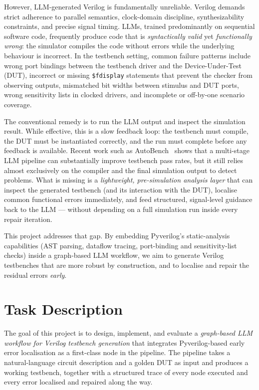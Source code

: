 \documentclass[11pt,a4paper, titlepage=false]{scrreprt}
\begin{document}
However, LLM-generated Verilog is fundamentally unreliable. Verilog demands strict adherence to
parallel semantics, clock-domain discipline, synthesizability constraints, and precise signal
timing. LLMs, trained predominantly on sequential software code, frequently produce code that
is \emph{syntactically valid} yet \emph{functionally wrong}: the simulator compiles the code
without errors while the underlying behaviour is incorrect. In the testbench setting, common
failure patterns include wrong port bindings between the testbench driver and the
Device-Under-Test (DUT), incorrect or missing \texttt{\$fdisplay} statements that prevent the
checker from observing outputs, mismatched bit widths between stimulus and DUT ports, wrong
sensitivity lists in clocked drivers, and incomplete or off-by-one scenario coverage.

The conventional remedy is to run the LLM output and inspect the simulation result. While
effective, this is a slow feedback loop: the testbench must compile, the DUT must be
instantiated correctly, and the run must complete before any feedback is available. Recent work
such as AutoBench~\cite{qiu2024autobench} shows that a multi-stage LLM pipeline can substantially
improve testbench pass rates, but it still relies almost exclusively on the compiler and the
final simulation output to detect problems. What is missing is a \emph{lightweight, pre-simulation
analysis layer} that can inspect the generated testbench (and its interaction with the DUT),
localise common functional errors immediately, and feed structured, signal-level guidance back
to the LLM --- without depending on a full simulation run inside every repair iteration.

This project addresses that gap. By embedding Pyverilog's static-analysis capabilities (AST
parsing, dataflow tracing, port-binding and sensitivity-list checks) inside a graph-based LLM
workflow, we aim to generate Verilog testbenches that are more robust by construction, and to
localise and repair the residual errors \emph{early}.


\section*{Task Description}

The goal of this project is to design, implement, and evaluate a \emph{graph-based LLM workflow
for Verilog testbench generation} that integrates Pyverilog-based early error localisation as
a first-class node in the pipeline. The pipeline takes a natural-language circuit description
and a golden DUT as input and produces a working testbench, together with a structured trace of
every node executed and every error localised and repaired along the way.
\end{document}
